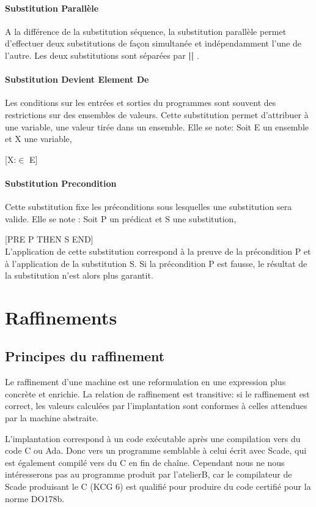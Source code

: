 \paragraph{Substitution Parallèle}
A la différence de la substitution séquence, la substitution parallèle permet
d'effectuer deux substitutions de façon simultanée et indépendamment l'une de
l'autre. Les deux substitutions sont séparées par \textbf{||} .

\paragraph{Substitution Devient Element De}
Les conditions sur les entrées et sorties du programmes sont souvent
des restrictions sur des ensembles de valeurs. Cette substitution permet
d'attribuer à une variable, une valeur tirée dans un ensemble. Elle se note:
Soit E un ensemble et X une variable, 

[X:$\in$ E] \\

\paragraph{Substitution Precondition}
Cette substitution fixe les
préconditions sous lesquelles une substitution sera valide. Elle se note : Soit P
un prédicat et S une substitution,

[PRE P THEN S END]\\
L'application de cette substitution correspond à la preuve de la
précondition P et à l'application de la substitution S. Si la
précondition P est fausse, le résultat de la substitution n'est alors
plus garantit.


\section{Raffinements}

\subsection{Principes du raffinement}

Le raffinement d'une machine est une reformulation en une
expression plus concrète et enrichie. La relation de raffinement est transitive:
si le raffinement est correct, les valeurs calculées par l'implantation sont
conformes à celles attendues par la machine abstraite.

L'implantation correspond à un code exécutable après une compilation vers du
code C ou Ada. Donc vers un programme semblable à celui écrit avec
Scade, qui est également compilé vers du C en fin de chaîne. Cependant
nous ne nous intéresserons pas au programme produit par l'atelierB,
car le compilateur de Scade produisant le C (KCG 6) est qualifié pour produire
du code certifié pour la norme DO178b.

